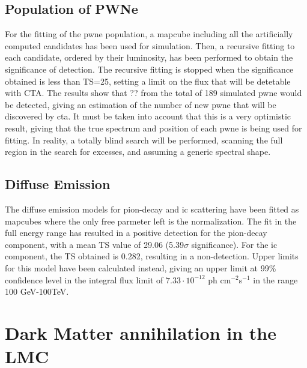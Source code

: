 \documentclass[main.tex]{subfiles}
\begin{document}
\subsection{Population of PWNe}

For the fitting of the \gls{pwne} population, a mapcube including all the artificially computed candidates has been used for simulation. Then, a recursive fitting to each candidate, ordered by their luminosity, has been performed to obtain the significance of detection. The recursive fitting is stopped when the significance obtained is less than TS=25, setting a limit on the flux that will be detetable with CTA. The results show that ?? from the total of 189 simulated \gls{pwne} would be detected, giving an estimation of the number of new \gls{pwne} that will be discovered by \gls{cta}. It must be taken into account that this is a very optimistic result, giving that the true spectrum and position of each \gls{pwne} is being used for fitting. In reality, a totally blind search will be performed, scanning the full region in the search for excesses, and assuming a generic spectral shape.

\subsection{Diffuse Emission}

The diffuse emission models for pion-decay and \gls{ic} scattering have been fitted as mapcubes where the only free parmeter left is the normalization. The fit in the full energy range has resulted in a positive detection for the pion-decay component, with a mean TS value of 29.06 (5.39$\sigma$ significance). For the \gls{ic} component, the TS obtained is 0.282, resulting in a non-detection. Upper limits for this model have been calculated instead, giving an upper limit at 99\% confidence level in the integral flux limit of $7.33\cdot10^{-12}$ ph cm$^{-2}$s$^{-1}$ in the range 100 GeV-100TeV.   


\section{Dark Matter annihilation in the LMC} \label{sec:dminlmc}
\end{document}
